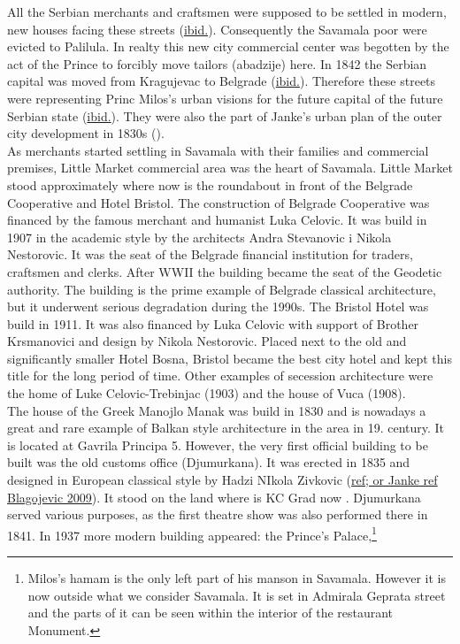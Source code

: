 \documentclass[11pt]{report}
\begin{document}
All  the  Serbian  merchants  and  craftsmen  were supposed  to  be settled in modern, new  houses facing these streets (\href{}{ibid.}).
Consequently the Savamala poor were evicted to Palilula. 
In realty this new city commercial center was begotten by the act of the Prince to forcibly move tailors (abadzije) here.
In 1842 the Serbian capital was moved from Kragujevac to Belgrade (\href{}{ibid.}).
Therefore these streets were representing Princ Milos’s urban visions for the future capital of the future Serbian state (\href{}{ibid.}).
They were also the part of Janke’s urban plan of the outer city development in 1830s (\href{}{\citealt{blagojevic_urban_2009}}). 
\\
As merchants started settling in Savamala with their families and commercial premises, Little Market commercial area was the heart of Savamala.
Little Market stood approximately where now is the roundabout in front of the Belgrade Cooperative and Hotel Bristol.
The construction of Belgrade Cooperative was financed by the famous merchant and humanist Luka Celovic.
It was build in 1907 in the academic style by the architects Andra Stevanovic i Nikola Nestorovic.
It was the seat of the Belgrade financial institution for traders, craftsmen and clerks.
After WWII the building became the seat of the Geodetic authority.
The building is the prime example of Belgrade classical architecture, but it underwent serious degradation during the 1990s.
The Bristol Hotel was build in 1911.
It was also financed by Luka Celovic with support of Brother Krsmanovici and design by Nikola Nestorovic. Placed next to the old and significantly smaller Hotel Bosna, Bristol became the best city hotel and kept this title for the long period of time.
Other examples of secession architecture were the home of Luke Celovic-Trebinjac (1903) and the house of Vuca (1908).
\\
The house of the Greek Manojlo Manak was build in 1830 and is nowadays a great and rare example of Balkan style architecture in the area in 19. century. It is located at Gavrila Principa 5.
However, the very first official building to be built was the old customs office (Djumurkana). It was erected in 1835 and designed in European classical style by Hadzi NIkola Zivkovic (\href{}{ref; or Janke ref Blagojevic 2009}). It stood on the land where is KC Grad now . Djumurkana served various purposes, as the first theatre show was also performed there in 1841.
In 1937 more modern building appeared: the Prince's Palace,\footnote{Milos's hamam is the only left part of his manson in Savamala. However it is now outside what we consider Savamala. It is set in Admirala Geprata street and the parts of it can be seen within the interior of the restaurant Monument.}
\end{document}

